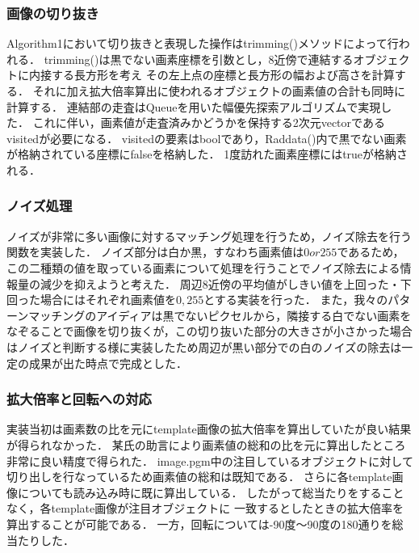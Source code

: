 \documentclass[platex,dvipdfmx]{jsarticle}
\begin{document}

\newpage


\subsubsection{画像の切り抜き}
Algorithm1において切り抜きと表現した操作はtrimming()メソッドによって行われる．
trimming()は黒でない画素座標を引数とし，8近傍で連結するオブジェクトに内接する長方形を考え
その左上点の座標と長方形の幅および高さを計算する．
それに加え拡大倍率算出に使われるオブジェクトの画素値の合計も同時に計算する．
連結部の走査はQueueを用いた幅優先探索アルゴリズムで実現した．
これに伴い，画素値が走査済みかどうかを保持する2次元vectorであるvisitedが必要になる．
visitedの要素はboolであり，Raddata()内で黒でない画素が格納されている座標にfalseを格納した．
1度訪れた画素座標にはtrueが格納される．\\



\newpage

\subsubsection{ノイズ処理}
ノイズが非常に多い画像に対するマッチング処理を行うため，ノイズ除去を行う関数を実装した．
ノイズ部分は白か黒，すなわち画素値は$0 or 255$であるため，この二種類の値を取っている画素について処理を行うことでノイズ除去による情報量の減少を抑えようと考えた．
周辺8近傍の平均値がしきい値を上回った・下回った場合にはそれぞれ画素値を$0,255$とする実装を行った．
また，我々のパターンマッチングのアイディアは黒でないピクセルから，隣接する白でない画素をなぞることで画像を切り抜くが，この切り抜いた部分の大きさが小さかった場合はノイズと判断する様に実装したため周辺が黒い部分での白のノイズの除去は一定の成果が出た時点で完成とした．


\newpage

\subsubsection{拡大倍率と回転への対応}
実装当初は画素数の比を元にtemplate画像の拡大倍率を算出していたが良い結果が得られなかった．
某氏の助言により画素値の総和の比を元に算出したところ非常に良い精度で得られた．
image.pgm中の注目しているオブジェクトに対して切り出しを行なっているため画素値の総和は既知である．
さらに各template画像についても読み込み時に既に算出している．
したがって総当たりをすることなく，各template画像が注目オブジェクトに
一致するとしたときの拡大倍率を算出することが可能である．
一方，回転については-90度〜90度の180通りを総当たりした．
\end{document}
